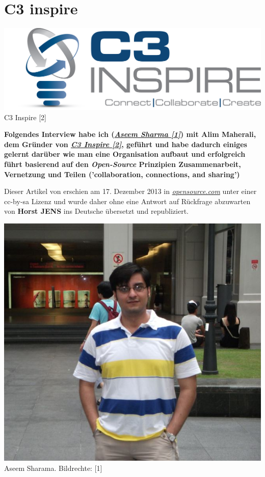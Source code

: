 \section*{C3 inspire}
\label{c3inspire}
\begin{center}
\includegraphics[width=0.8\linewidth]{c3inspire/c3inspire.png}\\
\footnotesize{C3 Inspire [2]}
\end{center}

\textbf{Folgendes Interview habe ich (\href{http://aseemsharma.info/about-me/aseemsharma/}{\textit{Aseem Sharma [1]}}) mit Alim Maherali, dem Gründer von \href{http://c3inspire.com}{\textit{C3 Inspire [2]}}, geführt und habe dadurch einiges gelernt darüber wie man eine Organisation aufbaut und erfolgreich führt basierend auf den \textit{Open-Source} Prinzipien Zusammenarbeit, Vernetzung und Teilen ('collaboration, connections, and sharing')}

Dieser Artikel von  erschien am 17. Dezember 2013 in \href{http://opensource.com/education/13/12/interview-Alim-Maherali-C3-Inspire}{\textit{opensource.com}} unter einer cc-by-sa Lizenz und wurde daher ohne eine Antwort auf Rückfrage abzuwarten von  \textbf{Horst JENS} ins Deutsche übersetzt und republiziert.\\

\begin{center}
\includegraphics[width=0.7\linewidth]{c3inspire/c3inspire_aseemsharma.jpg} \\
\footnotesize{Aseem Sharama. Bildrechte: [1]}
\end{center}

